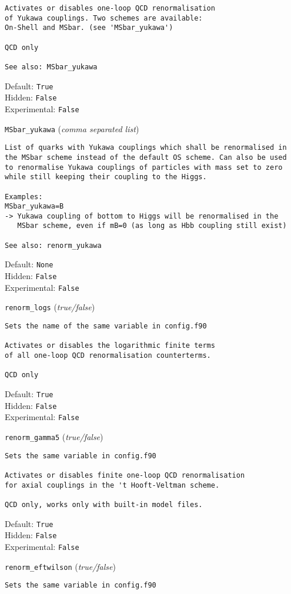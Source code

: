 \begin{basedescript}{\desclabelstyle{\pushlabel}}
\begin{verbatim}
Activates or disables one-loop QCD renormalisation
of Yukawa couplings. Two schemes are available:
On-Shell and MSbar. (see 'MSbar_yukawa')

QCD only

See also: MSbar_yukawa
\end{verbatim}
Default: \verb|True|
\\Hidden: \verb|False|
\\Experimental: \verb|False|
\\\item[\colorbox{gray!30}{\texttt{MSbar\_yukawa}}] (\textit{comma separated list})
\begin{verbatim}
List of quarks with Yukawa couplings which shall be renormalised in
the MSbar scheme instead of the default OS scheme. Can also be used
to renormalise Yukawa couplings of particles with mass set to zero
while still keeping their coupling to the Higgs.

Examples:
MSbar_yukawa=B
-> Yukawa coupling of bottom to Higgs will be renormalised in the
   MSbar scheme, even if mB=0 (as long as Hbb coupling still exist)

See also: renorm_yukawa
\end{verbatim}
Default: \verb|None|
\\Hidden: \verb|False|
\\Experimental: \verb|False|
\\\item[\colorbox{gray!30}{\texttt{renorm\_logs}}] (\textit{true/false})
\begin{verbatim}
Sets the name of the same variable in config.f90

Activates or disables the logarithmic finite terms
of all one-loop QCD renormalisation counterterms.

QCD only
\end{verbatim}
Default: \verb|True|
\\Hidden: \verb|False|
\\Experimental: \verb|False|
\\\item[\colorbox{gray!30}{\texttt{renorm\_gamma5}}] (\textit{true/false})
\begin{verbatim}
Sets the same variable in config.f90

Activates or disables finite one-loop QCD renormalisation
for axial couplings in the 't Hooft-Veltman scheme.

QCD only, works only with built-in model files.
\end{verbatim}
Default: \verb|True|
\\Hidden: \verb|False|
\\Experimental: \verb|False|
\\\item[\colorbox{gray!30}{\texttt{renorm\_eftwilson}}] (\textit{true/false})
\begin{verbatim}
Sets the same variable in config.f90


\end{verbatim}
\end{basedescript}
